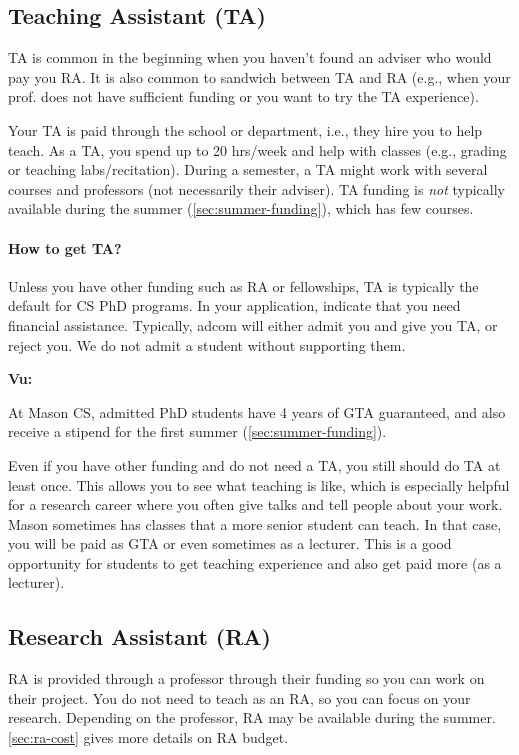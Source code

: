 \documentclass[oneside,11pt,dvipsnames]{book}
\newenvironment{commentbox}[1][]{
  \small
  \begin{mybox}
    {\small \textbf{#1}}
  }{
  \end{mybox}
}
\begin{document}
\subsection{Teaching Assistant (TA)}\label{sec:ta}

TA is common in the beginning when you haven't found an adviser who would pay you RA. It is also common to sandwich between TA and RA (e.g., when your prof. does not have sufficient funding or you want to try the TA experience).

Your TA is paid through the school or department, i.e., they hire you to help teach.
As a TA, you spend up to 20 hrs/week and help with classes (e.g., grading or teaching labs/recitation).
During a semester, a TA might work with several courses and professors (not necessarily their adviser).  TA funding is \emph{not} typically available during the summer (\autoref{sec:summer-funding}), which has few courses.

\paragraph{How to get TA?}  Unless you have other funding such as RA or fellowships, TA is typically the default for CS PhD programs. In your application, indicate that you need financial assistance. Typically, adcom will either admit you and give you TA, or reject you. We do not admit a student without supporting them.

\begin{commentbox}[Vu:]
  At Mason CS, admitted PhD students have 4 years of GTA guaranteed, and also receive a stipend for the first summer (\autoref{sec:summer-funding}).
\end{commentbox}

Even if you have other funding and do not need a TA, you still should do TA at least once.  This allows you to see what teaching is like, which is especially helpful for a research career where you often give talks and tell people about your work. Mason sometimes has classes that a more senior student can teach.  In that case, you will be paid as GTA or even sometimes as a lecturer.  This is a good opportunity for students to get teaching experience and also get paid more (as a lecturer).

\subsection{Research Assistant (RA)}\label{sec:ra}
RA is provided through a professor through their funding so you can work on their project.
You do not need to teach as an RA, so you can focus on your research. Depending on the professor, RA may be available during the summer. \autoref{sec:ra-cost} gives more details on RA budget.
\end{document}
